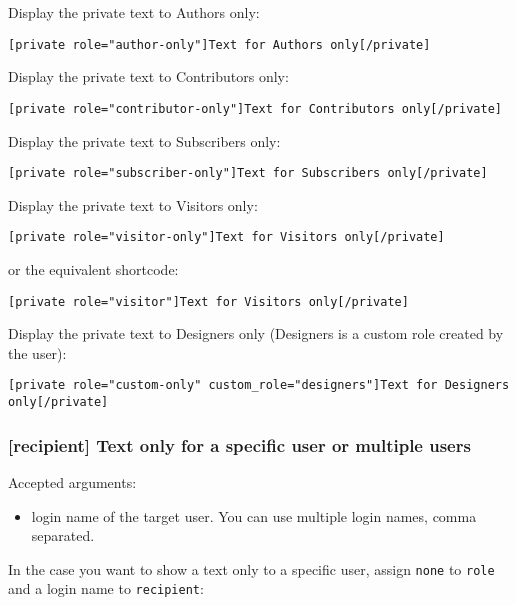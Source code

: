 \documentclass[
	titlepage,
	headinclude,
	abstract=on,
	paper=a4,
	fontsize=11pt,
]{scrartcl}
\begin{document}
Display the private text to Authors only:

\begin{lstlisting}
[private role="author-only"]Text for Authors only[/private]
\end{lstlisting}

Display the private text to Contributors only:

\begin{lstlisting}
[private role="contributor-only"]Text for Contributors only[/private]
\end{lstlisting}

Display the private text to Subscribers only:

\begin{lstlisting}
[private role="subscriber-only"]Text for Subscribers only[/private]
\end{lstlisting}

Display the private text to Visitors only:

\begin{lstlisting}
[private role="visitor-only"]Text for Visitors only[/private]
\end{lstlisting}

or the equivalent shortcode:

\begin{lstlisting}
[private role="visitor"]Text for Visitors only[/private]
\end{lstlisting}

Display the private text to Designers only (Designers is a custom role created by the user):

\begin{lstlisting}
[private role="custom-only" custom_role="designers"]Text for Designers only[/private]
\end{lstlisting}

\subsubsection{[recipient] Text only for a specific user or multiple users}

Accepted arguments:

\begin{itemize}
 \item login name of the target user. You can use multiple login names, comma separated.
\end{itemize}

In the case you want to show a text only to a specific user, assign \verb+none+ to \verb+role+ and a login name to \verb+recipient+:
\end{document}
